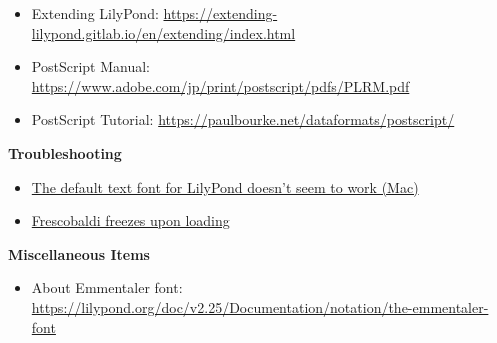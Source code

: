 \documentclass[11pt, oneside]{book}   	%
\begin{document}
\begin{appendices}
\begin {itemize}
\item Extending LilyPond: \url{https://extending-lilypond.gitlab.io/en/extending/index.html}
\item PostScript Manual: \url{https://www.adobe.com/jp/print/postscript/pdfs/PLRM.pdf}
\item PostScript Tutorial: \url{https://paulbourke.net/dataformats/postscript/}
\end{itemize}
\textbf{Troubleshooting}
\begin{itemize}
\item \href{https://github.com/Homebrew/homebrew-core/pull/118260#issuecomment-1368249969}{The default text font for LilyPond doesn’t seem to work (Mac)}
\item \href{https://github.com/frescobaldi/frescobaldi/issues/1793}{Frescobaldi freezes upon loading}
\end{itemize}

\textbf{Miscellaneous Items}
\begin{itemize}
\item About Emmentaler font: \url{https://lilypond.org/doc/v2.25/Documentation/notation/the-emmentaler-font}
\end{itemize}


\end{appendices}
\end{document}
